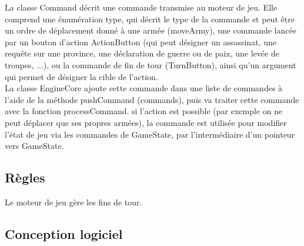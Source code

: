 \documentclass[a4paper,12pt]{article}
\begin{document}
La classe Command décrit une commande transmise au moteur de jeu. Elle comprend une énumération type, qui décrit le type de la commande et peut être un ordre de déplacement donné à une armée (moveArmy), une commande lancée par un bouton d'action ActionButton (qui peut désigner un assassinat, une requête sur une province, une déclaration de guerre ou de paix, une levée de troupes, ...), ou la commande de fin de tour (TurnButton), ainsi qu'un argument qui permet de désigner la cible de l'action.\\

La classe EngineCore ajoute cette commande dans une liste de commandes à l'aide de la méthode pushCommand (commands), puis va traiter cette commande avec la fonction processCommand. si l'action est possible (par exemple on ne peut déplacer que ses propres armées), la commande est utilisée pour modifier l'état de jeu via les commandes de GameState, par l'intermédiaire d'un pointeur vers GameState.\\

\subsection{Règles}

Le moteur de jeu gère les fins de tour.

\subsection{Conception logiciel}
\end{document}
